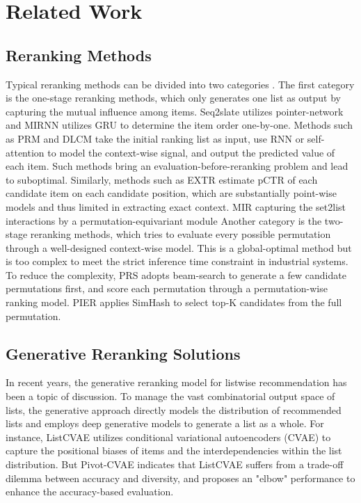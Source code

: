 \section{Related Work}
\subsection{Reranking Methods}

Typical reranking methods can be divided into two categories \cite{pier}. The first category is the one-stage reranking methods, which only generates one list as output by capturing the mutual influence among items. Seq2slate \cite{seq2slate} utilizes pointer-network and MIRNN \cite{zhuang2018globally} utilizes GRU to determine the item order one-by-one. Methods such as PRM \cite{prm} and DLCM \cite{ai2018learning} take the initial ranking list as input, use RNN or self-attention to model the context-wise signal, and output the predicted value of each item. Such methods bring an evaluation-before-reranking problem \cite{xi2021context} and lead to suboptimal. Similarly, methods such as EXTR \cite{extr} estimate pCTR of each candidate item on each candidate position, which are substantially point-wise models and thus limited in extracting exact context. MIR \cite{mir} capturing the set2list interactions by a permutation-equivariant module
Another category is the two-stage reranking methods, which tries to evaluate every possible permutation through a well-designed context-wise model. This is a global-optimal method but is too complex to meet the strict inference time constraint in industrial systems. To reduce the complexity, PRS \cite{feng2021revisit} adopts beam-search to generate a few candidate permutations first, and score each permutation through a permutation-wise ranking model. PIER \cite{pier} applies SimHash to select top-K candidates from the full permutation.  

\subsection{ Generative Reranking Solutions}

In recent years, the generative reranking model  for listwise recommendation has been a topic of discussion. To manage the vast combinatorial output space of lists, the generative approach directly models the distribution of recommended lists and employs deep generative models to generate a list as a whole. For instance, ListCVAE \cite{listcvae} utilizes conditional variational autoencoders (CVAE) to capture the positional biases of items and the interdependencies within the list distribution. But Pivot-CVAE \cite{pivotcvae} indicates that ListCVAE suffers from a trade-off dilemma between accuracy and diversity, and proposes an "elbow" performance to enhance the accuracy-based evaluation. 


